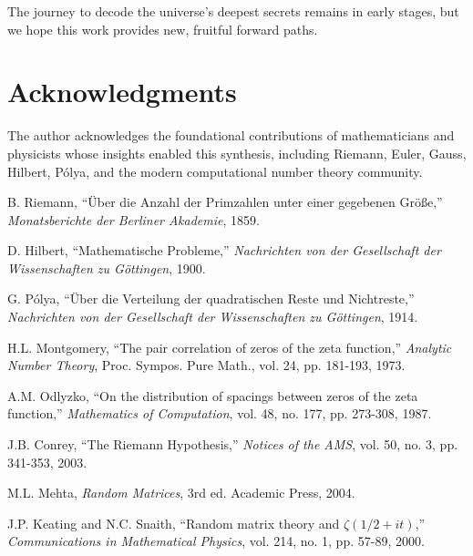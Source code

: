 \documentclass[11pt,a4paper]{article}
\begin{document}
The journey to decode the universe's deepest secrets remains in early stages, but we hope this work provides new, fruitful forward paths.

\section*{Acknowledgments}

The author acknowledges the foundational contributions of mathematicians and physicists whose insights enabled this synthesis, including Riemann, Euler, Gauss, Hilbert, Pólya, and the modern computational number theory community.


\begin{thebibliography}{99}

B. Riemann, ``Über die Anzahl der Primzahlen unter einer gegebenen Größe,'' \textit{Monatsberichte der Berliner Akademie}, 1859.

D. Hilbert, ``Mathematische Probleme,'' \textit{Nachrichten von der Gesellschaft der Wissenschaften zu Göttingen}, 1900.

G. Pólya, ``Über die Verteilung der quadratischen Reste und Nichtreste,'' \textit{Nachrichten von der Gesellschaft der Wissenschaften zu Göttingen}, 1914.

H.L. Montgomery, ``The pair correlation of zeros of the zeta function,'' \textit{Analytic Number Theory}, Proc. Sympos. Pure Math., vol. 24, pp. 181-193, 1973.

A.M. Odlyzko, ``On the distribution of spacings between zeros of the zeta function,'' \textit{Mathematics of Computation}, vol. 48, no. 177, pp. 273-308, 1987.

J.B. Conrey, ``The Riemann Hypothesis,'' \textit{Notices of the AMS}, vol. 50, no. 3, pp. 341-353, 2003.

M.L. Mehta, \textit{Random Matrices}, 3rd ed. Academic Press, 2004.

J.P. Keating and N.C. Snaith, ``Random matrix theory and $\zeta(1/2+it)$,'' \textit{Communications in Mathematical Physics}, vol. 214, no. 1, pp. 57-89, 2000.

\end{thebibliography}
\end{document}
